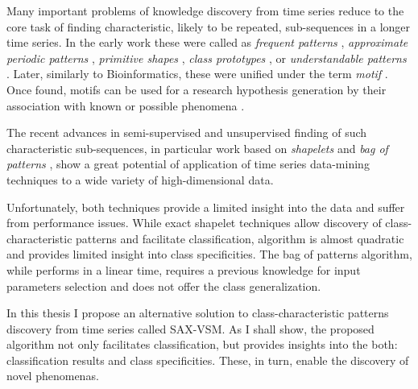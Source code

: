 Many important problems of knowledge discovery from time series reduce to the core task of finding 
characteristic, likely to be repeated, sub-sequences in a longer time series. 
In the early work these were called as 
\textit{frequent patterns} \cite{citeulike:5159615}, 
\textit{approximate periodic patterns} \cite{citeulike:1959582},
\textit{primitive shapes} \cite{citeulike:5898869}, 
\textit{class prototypes} \cite{citeulike:4406444}, 
or \textit{understandable patterns} \cite{citeulike:3978076}. 
Later, similarly to Bioinformatics, these were unified under the term \textit{motif} \cite{citeulike:3977965}.
Once found, motifs can be used for a research hypothesis generation by their association with known
or possible phenomena \cite{citeulike:3977965}. 

The recent advances in semi-supervised and unsupervised finding of such characteristic sub-sequences, 
in particular work based on \textit{shapelets} \cite{citeulike:7344347} \cite{citeulike:11957982}
\cite{citeulike:12552293} and \textit{bag of patterns} \cite{citeulike:10525778}, show a great potential 
of application of time series data-mining techniques to a wide variety of high-dimensional data.

Unfortunately, both techniques provide a limited insight into the data and suffer from performance issues. 
While exact shapelet techniques allow discovery of class-characteristic patterns and facilitate classification,
algorithm is almost quadratic and provides limited insight into class specificities. 
The bag of patterns algorithm, while performs in a linear time, requires a previous knowledge for input parameters 
selection and does not offer the class generalization.

In this thesis I propose an alternative solution to class-characteristic patterns discovery from time series called 
SAX-VSM. As I shall show, the proposed algorithm not only facilitates classification, but provides insights into 
the both: classification results and class specificities. These, in turn, enable the discovery of novel phenomenas.

%
%
